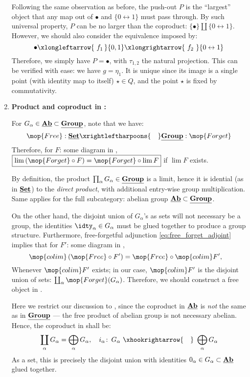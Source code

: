 \documentclass[a4paper,10pt]{article}
\newcommand{\colim}{\mop{colim}}
\begin{document}
\begin{enumerate}
	Following the same observation as before, the push-out $P$ is the ``largest'' object that any map out of $\bullet$ and $\{0\leftrightarrow  1\}$ must pass through. By such universal property, $P$ can be no larger than the coproduct: $
		\{\bullet\} \coprod \{0\leftrightarrow 1\}
	$. However, we should also consider the equivalence imposed by: 
	\begin{equation}
		\bullet
		\xlongleftarrow{\ f_1\,} \{0,1\}
		\xlongrightarrow{\ f_2\ }
		\{0\leftrightarrow 1\}
	\end{equation}
	Therefore, we simply have $P = \bullet$, with $\tau_{1,2}$ the natural projection. This can be verified with ease: we have $g = \eta_1$. It is unique since its image is a single point (with identity map to itself) $\star \in Q$, and the point $\star$ is fixed by commutativity. \qedfull
	
	\item \textbf{Product and coproduct in :}
	
	For $G_\alpha\in\underline{\mathbf{Ab}}\subset\underline{\mathbf{Group}}$, note that we have:
	\begin{equation}
		\mop{Free}:
			\Cat{Set}
			\xrightleftharpoons{\quad}
			\Cat{Group}
		:\mop{Forget}
	\label{eq:free_forget_adjoint}
	\end{equation}
	Therefore, for $F$: some diagram in , $
		\boxed{\lim\,(\mop{Forget}\circ F)
		= \mop{Forget}\circ\lim F}
	$ if $\lim F$ exists. 
	
	By definition, the product $\prod_\alpha G_\alpha\in \underline{\mathbf{Group}}$ is a limit, hence it is idential (as in $\underline{\mathbf{Set}}\mspace{.2mu}$) to the \textit{direct product}, with additional entry-wise group multiplication. Same applies for the full subcategory: abelian group $\underline{\mathbf{Ab}}\subset\underline{\mathbf{Group}}$. 
	
	On the other hand, the disjoint union of $G_\alpha$'s as sets will not necessary be a group, the identities $\idty_\alpha\in G_\alpha$ must be glued together to produce a group structure. Furthermore, free-forgetful adjunction \eqref{eq:free_forget_adjoint} implies that for $F'$: some diagram in ,
	\begin{equation}
		\colim\,(\mop{Free}\circ F')
		= \mop{Free}\circ\colim F',\quad
	\end{equation}
	Whenever $\colim F'$ exists; in our case, $\colim F'$ is the disjoint union of sets: $
		\coprod_\alpha \mop{Forget}(G_\alpha)
	$. Therefore, we should construct a free object in . 
	
	Here we restrict our discussion to , since the coproduct in $\underline{\mathbf{Ab}}$ is \textit{not} the same as in $\underline{\mathbf{Group}}$ --- the free product of abelian group is not necessary abelian. Hence, the coproduct in  shall be:
	\begin{equation}
		\coprod_\alpha G_\alpha
		= \bigoplus_\alpha G_\alpha,\quad
		i_\alpha\colon\, G_\alpha
			\ \xhookrightarrow{\quad}\ %
			\bigoplus_\alpha G_\alpha
	\end{equation}
	As a set, this is precisely the disjoint union with identities $0_\alpha \in G_\alpha \subset \underline{\mathbf{Ab}}$ glued together. 
	

\end{enumerate}
\end{document}
